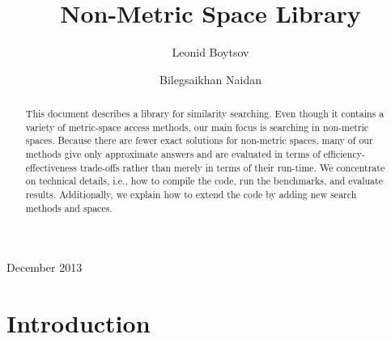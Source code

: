 \documentclass[runningheads,a4paper]{llncs}
\begin{document}
\mainmatter  %

\title{Non-Metric Space Library}


%
%
\author{Leonid Boytsov \and Bilegsaikhan Naidan}
%


%
%


\maketitle

{\begin{center}{December 2013}\end{center}}

\begin{abstract}
This document describes a library for similarity searching.
Even though it contains a variety of metric-space access methods,
our main focus is searching in non-metric spaces.
Because there are fewer exact solutions for non-metric spaces,
many of our methods give only approximate answers and 
are evaluated in terms of efficiency-effectiveness trade-offs
rather than merely in terms of their run-time.
We concentrate on technical details, i.e., 
how to compile the code, run the benchmarks, and evaluate results.
Additionally, we explain how to extend the code by adding
new search methods and spaces.
\end{abstract}


%
%

\section{Introduction}
\end{document}
